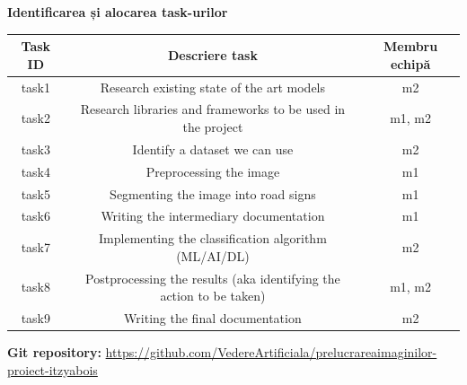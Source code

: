 \documentclass{article}
\begin{document}



\textbf{Identificarea și alocarea task-urilor}

\begin{center}
\begin{tabular}{ |c|c|c| }
 \hline
 \textbf{Task ID} & \textbf{Descriere task} & \textbf{Membru echipă} \\
  \hline
 task1 & Research existing state of the art models & m2 \\ %
  \hline
 task2 & Research libraries and frameworks to be used in the project & m1, m2 \\
 \hline
 task3 & Identify a dataset we can use & m2 \\
 \hline
 task4 & Preprocessing the image & m1 \\
 \hline
 task5 & Segmenting the image into road signs & m1 \\
 \hline
 task6 & Writing the intermediary documentation & m1 \\
 \hline
 task7 & Implementing the classification algorithm (ML/AI/DL) & m2 \\
 \hline
 task8 & Postprocessing the results (aka identifying the action to be taken) & m1, m2 \\
 \hline
 task9 & Writing the final documentation & m2 \\
 \hline
\end{tabular}
\end{center}

\textbf{Git repository:} \url{https://github.com/VedereArtificiala/prelucrareaimaginilor-proiect-itzyabois}






\end{document}
